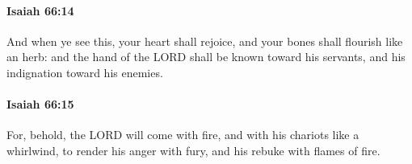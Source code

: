 		\paragraph{Isaiah 66:14} %
			\label{ISAIAH-66-14}

			And when ye see this, your heart shall rejoice, and your bones shall flourish like an herb: and the hand of the LORD shall be known toward his servants, and his indignation toward his enemies.


		\paragraph{Isaiah 66:15} %
			\label{ISAIAH-66-15}

			For, behold, the LORD will come with fire, and with his chariots like a whirlwind, to render his anger with fury, and his rebuke with flames of fire.


